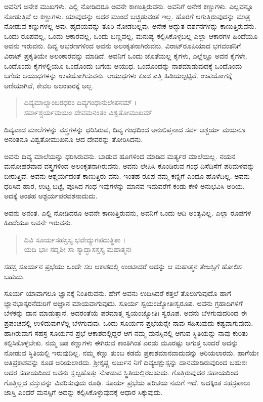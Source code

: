 ಅವನಿಗೆ ಅನೇಕ ಮುಖಗಳು. ಎಲ್ಲಿ ನೋಡಿದರೂ ಅವನೇ ಕಾಣುತ್ತಿರುವನು. ಅವನಿಗೆ ಅನೇಕ ಕಣ್ಣುಗಳು. ಎಲ್ಲವನ್ನೂ ನೋಡುತ್ತಿವೆ ಆ ಕಣ್ಣುಗಳು. ಯಾವುದನ್ನು ಅದರ ಮುಂದೆ ಬಚ್ಚಿಡುವಂತೆ ಇಲ್ಲ. ಹೊರಗೆ ಆಗುತ್ತಿರುವುದನ್ನು ಮಾತ್ರ ನೋಡುವ ಕಣ್ಣುಗಳಲ್ಲ ಅವು, ಹೃದಯವನ್ನು ತೂರಿ ನೋಡಬಲ್ಲವು. ಅನೇಕ ಅದ್ಭುತ ದರ್ಶನಗಳನ್ನು ಕಾಣುತ್ತಿರುವನು. ಒಂದು ರೂಪವಲ್ಲ, ಒಂದು ಆಕಾರವಲ್ಲ, ಒಂದು ಬಣ್ಣವಲ್ಲ, ಮನುಷ್ಯ ಕಲ್ಪಿಸಿಕೊಳ್ಳಬಲ್ಲ ಎಲ್ಲಾ ಆಕಾರಗಳ ಹಿಂದೆಯೂ ಅವನು ಇರುವನು. ದಿವ್ಯ ಆಭರಣಗಳಿಂದ ಅವನು ಅಲಂಕೃತನಾಗಿರುವನು. ವಿರಾಟ್​ರೂಪಿಯಾದ ಭಗವಂತನಿಗೆ ವಿರಾಟ್ ಪ್ರಕೃತಿಯೇ ಅಲಂಕಾರವನ್ನು ಮಾಡಿದೆ. ಅವನಿಗೆ ಒಂದು ಜೊತೆಯಲ್ಲ ಕೈಗಳು, ಎಲ್ಲೆಲ್ಲೂ ಅವನ ಕೈಗಳೇ, ಒಂದೊಂದು ಕೈಗಳಲ್ಲಿಯೂ ಒಂದೊಂದು ಬಗೆಯ ಆಯುಧ. ಒಂದೊಂದನ್ನು ನಾಶಮಾಡುವುದಕ್ಕೆ ಒಂದೊಂದು ಬಗೆಯ ಆಯುಧಗಳನ್ನು ಉಪಯೋಗಿಸುವನು. ಆಯುಧಗಳು ಕೂಡ ಎತ್ತಿ ಹಿಡಿಯಲ್ಪಟ್ಟಿವೆ. ಉಪಯೋಗಕ್ಕೆ ಅಣಿಯಾಗಿವೆ, ಕೇವಲ ಅಲಂಕಾರಕ್ಕೆ ಅಲ್ಲ.

\begin{verse}
ದಿವ್ಯಮಾಲ್ಯಾಂಬರಧರಂ ದಿವ್ಯಗಂಧಾನುಲೇಪನಮ್ ।\\ಸರ್ವಾಶ್ಚರ್ಯಮಯಂ ದೇವಮನಂತಂ ವಿಶ್ವತೋಮುಖಮ್ 
\end{verse}

{\small ದಿವ್ಯವಾದ ಮಾಲೆಗಳನ್ನು ವಸ್ತ್ರಗಳನ್ನು ಧರಿಸಿರುವ, ದಿವ್ಯ ಗಂಧದಿಂದ ಅನುಲಿಪ್ತನಾದ ಸರ್ವ ಆಶ್ಚರ್ಯ ಮಯನೂ ಅನಂತನೂ ವಿಶ್ವತೋಮುಖನೂ ಆದ ದೇವರನ್ನು ತೋರಿಸಿದನು.}

ಅವನು ದಿವ್ಯ ಮಾಲೆಯನ್ನು ಧರಿಸಿರುವನು. ಬಾಡುವ ಹೂಗಳಿಂದ ಮಾಡಿದ ಮರ್ತ್ಯರ ಮಾಲೆಯಲ್ಲ. ನಯನ ಮನೋಹರವಾದ ವಸ್ತ್ರಗಳಿಂದ ಅಲಂಕೃತನಾಗಿರುವನು. ಅವನು ಲೇಪಿಸಿ ಕೊಂಡಿರುವ ಗಂಧ ದಿಸೆದಿಸೆಗೆ ಪರಿಮಳವನ್ನು ಬೀರುತ್ತಿವೆ. ಅವನು ಆಶ್ಚರ್ಯದಂತೆ ಕಾಣುತ್ತಿರು ವನು. ಇಂತಹ ರೂಪ ನಮ್ಮ ಕಣ್ಣಿಗೆ ಎಂದೂ ಹೊಳೆದಿಲ್ಲ. ಅವನು ಧರಿಸಿದ ಹಾರ, ಉಟ್ಟ ಬಟ್ಟೆ, ಪೂಸಿದ ಗಂಧ ಇವುಗಳನ್ನು ಮಾನವ ಇದುವರೆಗೆ ಕಂಡು ಕೇಳಿ ಅನುಭವಿಸಿ ಅರಿಯ. ಅದಕ್ಕೆ ಅಂತಹ ಆಶ್ಟರ್ಯಪರವಶನಾದುದು.

ಅವನು ಅನಂತ. ಎಲ್ಲಿ ನೋಡಿದರೂ ಅವನೇ ಕಾಣುತ್ತಿರುವನು, ಅವನಿಗೆ ಒಂದು ಆದಿ ಅಂತ್ಯವಿಲ್ಲ. ಎಲ್ಲಾ ರೂಪಗಳ ಹಿಂದೆಯೂ ಅವನೇ ಇರುವನು.

\begin{verse}
ದಿವಿ ಸೂರ್ಯಸಹಸ್ರಸ್ಯ ಭವೇದ್ಯುಗಪದುತ್ಥಿತಾ ।\\ಯದಿ ಭಾಃ ಸದೃಶೀ ಸಾ ಸ್ಯಾದ್ಭಾಸಸ್ತಸ್ಯ ಮಹಾತ್ಮನಃ 
\end{verse}

{\small ಸಹಸ್ರ ಸೂರ್ಯನ ಪ್ರಭೆಯು ಒಂದೇ ಸಲ ಆಕಾಶದಲ್ಲಿ ಉಂಟಾದರೆ ಅದನ್ನು ಆ ಮಹಾತ್ಮನ ತೇಜಸ್ಸಿಗೆ ಹೋಲಿಸ ಬಹುದು.}

ಸೂರ್ಯ ಯಾವಾಗಲೂ ಜ್ಞಾನಕ್ಕೆ ನಿಂತಿರುವನು. ಹೇಗೆ ಅವನು ಉದಿಸಿದರೆ ಕತ್ತಲೆ ತೊಲುಗುವುದೊ ಹಾಗೆ ಜ್ಞಾನಭಾಸ್ಕರನೆದುರಿಗೆ ಅಜ್ಞಾನ ಮಾಯವಾಗುವುದು. ಸೂರ್ಯ ಸ್ವಯಂಜ್ಯೋತಿಃಸ್ವರೂಪ. ಅವನು ಗ್ರಹಾದಿಗಳಿಗೆ ಬೆಳಕನ್ನು ದಾನ ಮಾಡುತ್ತಾನೆ. ಅದರಂತೆಯೆ ಪರಮಾತ್ಮ ಸ್ವಯಂಜ್ಯೋತಿಃ ಸ್ವರೂಪ. ಅವನು ಬೆಳಗುವುದರಿಂದ ಈ ಪ್ರಪಂಚದಲ್ಲಿ ಉಳಿದುವುಗಳೆಲ್ಲ ಬೆಳಗುವುವು. ಒಂದು ಸೂರ್ಯನ ಪ್ರಭೆಯನ್ನೇ ನಾವು ಸಹಿಸುವುದು ಕಷ್ಟವಾಗುವುದು. ಹಾಗಿರುವಾಗ ಸಹಸ್ರ ಸೂರ್ಯನ ಪ್ರಭೆ ಆಕಾಶದಲ್ಲಿದ್ದರೆ ಆಗ ನಮ್ಮ ಮನಸ್ಸಿನಲ್ಲಿ ಆಗುವ ಸ್ಥಿತಿಯನ್ನು ನಾವು ಕುರಿತು ಕಲ್ಪಿಸಿಕೊಳ್ಳಬೇಕು. ನಮ್ಮ ಜಡ ಕಣ್ಣುಗಳು ಈಗಿರುವ ಕಾಂತಿಗಿಂತ ಎರಡು ಮೂರಷ್ಟು ಆಗುತ್ತ ಬಂದರೆ ಅದನ್ನು ನೋಡುವ ಸ್ಥಿತಿಯಲ್ಲಿ ಇರುವುದಿಲ್ಲ. ನಮ್ಮ ಕಣ್ಣು ತುಂಬ ಕಡಮೆ ಪ್ರಕಾಶಮಾನವಾದುದನ್ನು ಅರಿಯಲಾರದು. ಹಾಗೆಯೇ ಅತಿಪ್ರಕಾಶವನ್ನು ಕೂಡ ಅರಿಯಲಾರದು. ಶ್ರೀಕೃಷ್ಣ ಅರ್ಜುನ ನಿಗೆ ದಿವ್ಯಚಕ್ಷುಸ್ಸನ್ನು ದಾನಮಾಡಿರುವುರಿಂದ ಬಹುಶಃ ಅದರ ಸಹಾಯದಿಂದ ಅವನು ಸ್ವಲ್ಪಹೊತ್ತು ನೋಡುವ ಸ್ಥಿತಿಯಲ್ಲಿರಬಹುದು. ಗೊತ್ತಿರುವುದರ ಸಹಾಯದಿಂದ ಗೊತ್ತಿಲ್ಲದ ವಸ್ತುವನ್ನು ವಿವರಿಸುವುದು ರೂಢಿ. ಸೂರ್ಯ ಪ್ರಭೆಯ ಪರಿಚಯ ನಮಗೆ ಇದೆ. ಅದಕ್ಕಿಂತ ಸಹಸ್ರಪಾಲು ಜಾಸ್ತಿ ಎಂದರೆ ಮನಸ್ಸಿಗೆ ಅದನ್ನು ಕಲ್ಪಿಸಿಕೊಳ್ಳುವುದಕ್ಕೆ ಆಧಾರ ಸಿಕ್ಕುವುದು.

